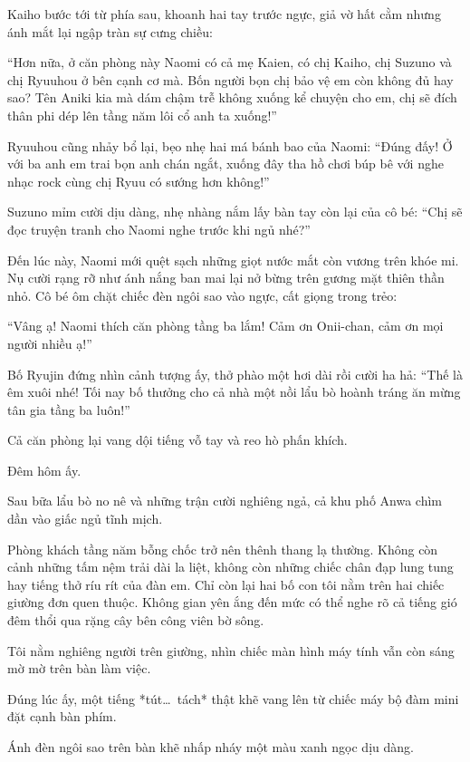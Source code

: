 ﻿\documentclass[../main.tex]{subfiles}
\begin{document}
Kaiho bước tới từ phía sau, khoanh hai tay trước ngực, giả vờ hất cằm nhưng ánh mắt lại ngập tràn sự cưng chiều:

``Hơn nữa, ở căn phòng này Naomi có cả mẹ Kaien, có chị Kaiho, chị Suzuno và chị Ryuuhou ở bên cạnh cơ mà. Bốn người bọn chị bảo vệ em còn không đủ hay sao? Tên Aniki kia mà dám chậm trễ không xuống kể chuyện cho em, chị sẽ đích thân phi dép lên tầng năm lôi cổ anh ta xuống!''

Ryuuhou cũng nhảy bổ lại, bẹo nhẹ hai má bánh bao của Naomi: ``Đúng đấy! Ở với ba anh em trai bọn anh chán ngắt, xuống đây tha hồ chơi búp bê với nghe nhạc rock cùng chị Ryuu có sướng hơn không!''

Suzuno mỉm cười dịu dàng, nhẹ nhàng nắm lấy bàn tay còn lại của cô bé: ``Chị sẽ đọc truyện tranh cho Naomi nghe trước khi ngủ nhé?''

Đến lúc này, Naomi mới quệt sạch những giọt nước mắt còn vương trên khóe mi. Nụ cười rạng rỡ như ánh nắng ban mai lại nở bừng trên gương mặt thiên thần nhỏ. Cô bé ôm chặt chiếc đèn ngôi sao vào ngực, cất giọng trong trẻo:

``Vâng ạ! Naomi thích căn phòng tầng ba lắm! Cảm ơn Onii-chan, cảm ơn mọi người nhiều ạ!''

Bố Ryujin đứng nhìn cảnh tượng ấy, thở phào một hơi dài rồi cười ha hả: ``Thế là êm xuôi nhé! Tối nay bố thưởng cho cả nhà một nồi lẩu bò hoành tráng ăn mừng tân gia tầng ba luôn!''

Cả căn phòng lại vang dội tiếng vỗ tay và reo hò phấn khích.

\ct

Đêm hôm ấy.

Sau bữa lẩu bò no nê và những trận cười nghiêng ngả, cả khu phố Anwa chìm dần vào giấc ngủ tĩnh mịch.

Phòng khách tầng năm bỗng chốc trở nên thênh thang lạ thường. Không còn cảnh những tấm nệm trải dài la liệt, không còn những chiếc chân đạp lung tung hay tiếng thở ríu rít của đàn em. Chỉ còn lại hai bố con tôi nằm trên hai chiếc giường đơn quen thuộc. Không gian yên ắng đến mức có thể nghe rõ cả tiếng gió đêm thổi qua rặng cây bên công viên bờ sông.

Tôi nằm nghiêng người trên giường, nhìn chiếc màn hình máy tính vẫn còn sáng mờ mờ trên bàn làm việc.

Đúng lúc ấy, một tiếng *tút\dots\ tách* thật khẽ vang lên từ chiếc máy bộ đàm mini đặt cạnh bàn phím.

Ánh đèn ngôi sao trên bàn khẽ nhấp nháy một màu xanh ngọc dịu dàng.
\end{document}
